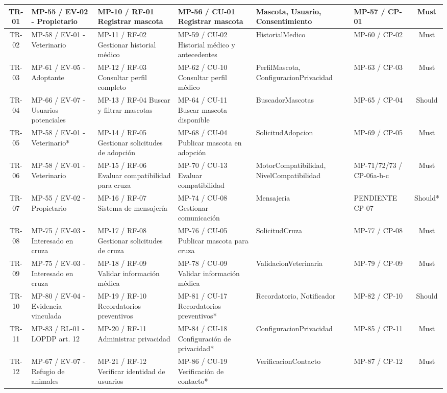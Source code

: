 \documentclass[journal,onecolumn]{IEEEtran}
\begin{document}
\begin{longtable}{|c|p{2.6cm}|p{2.9cm}|p{2.9cm}|p{2.6cm}|p{1.8cm}|c|}
		TR-01 & MP-55 / EV-02 - Propietario & MP-10 / RF-01 Registrar mascota & MP-56 / CU-01 Registrar mascota & Mascota, Usuario, Consentimiento & MP-57 / CP-01 & Must \\
		\hline
		TR-02 & MP-58 / EV-01 - Veterinario & MP-11 / RF-02 Gestionar historial médico & MP-59 / CU-02 Historial médico y antecedentes & HistorialMedico & MP-60 / CP-02 & Must \\
		\hline
		TR-03 & MP-61 / EV-05 - Adoptante & MP-12 / RF-03 Consultar perfil completo & MP-62 / CU-10 Consultar perfil médico & PerfilMascota, ConfiguracionPrivacidad & MP-63 / CP-03 & Must \\
		\hline
		TR-04 & MP-66 / EV-07 - Usuarios potenciales & MP-13 / RF-04 Buscar y filtrar mascotas & MP-64 / CU-11 Buscar mascota disponible & BuscadorMascotas & MP-65 / CP-04 & Should \\
		\hline
		TR-05 & MP-58 / EV-01 - Veterinario* & MP-14 / RF-05 Gestionar solicitudes de adopción & MP-68 / CU-04 Publicar mascota en adopción & SolicitudAdopcion & MP-69 / CP-05 & Must \\
		\hline
		TR-06 & MP-58 / EV-01 - Veterinario & MP-15 / RF-06 Evaluar compatibilidad para cruza & MP-70 / CU-13 Evaluar compatibilidad & MotorCompatibilidad, NivelCompatibilidad & MP-71/72/73 / CP-06a-b-c & Must \\
		\hline
		TR-07 & MP-55 / EV-02 - Propietario & MP-16 / RF-07 Sistema de mensajería & MP-74 / CU-08 Gestionar comunicación & Mensajeria & PENDIENTE CP-07 & Should* \\
		\hline
		TR-08 & MP-75 / EV-03 - Interesado en cruza & MP-17 / RF-08 Gestionar solicitudes de cruza & MP-76 / CU-05 Publicar mascota para cruza & SolicitudCruza & MP-77 / CP-08 & Must \\
		\hline
		TR-09 & MP-75 / EV-03 - Interesado en cruza & MP-18 / RF-09 Validar información médica & MP-78 / CU-09 Validar información médica & ValidacionVeterinaria & MP-79 / CP-09 & Must \\
		\hline
		TR-10 & MP-80 / EV-04 - Evidencia vinculada & MP-19 / RF-10 Recordatorios preventivos & MP-81 / CU-17 Recordatorios preventivos* & Recordatorio, Notificador & MP-82 / CP-10 & Should \\
		\hline
		TR-11 & MP-83 / RL-01 - LOPDP art. 12 & MP-20 / RF-11 Administrar privacidad & MP-84 / CU-18 Configuración de privacidad* & ConfiguracionPrivacidad & MP-85 / CP-11 & Must \\
		\hline
		TR-12 & MP-67 / EV-07 - Refugio de animales & MP-21 / RF-12 Verificar identidad de usuarios & MP-86 / CU-19 Verificación de contacto* & VerificacionContacto & MP-87 / CP-12 & Must \\

\end{longtable}
\end{document}
